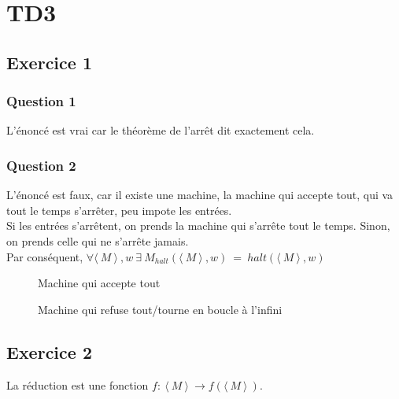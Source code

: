 \section{TD3}

\subsection{Exercice 1}

\subsubsection{Question 1}

L'énoncé est vrai car le théorème de l'arrêt dit exactement cela.

\subsubsection{Question 2}

L'énoncé est faux, car il existe une machine, la machine qui accepte tout, qui va tout le temps s'arrêter, peu impote les entrées.\\
Si les entrées s'arrêtent, on prends la machine qui s'arrête tout le temps. Sinon, on prends celle qui ne s'arrête jamais.\\
Par conséquent, $\forall \langle\ M\ \rangle \!\ ,w~\exists~M_{halt}(\langle\ M\ \rangle \!\ , w)~=~halt(\langle\ M\ \rangle \!\ , w)$

\begin{figure}[ht]
  \centering
  \caption{Machine qui accepte tout}
\end{figure}

\begin{figure}[ht]
  \centering
  \caption{Machine qui refuse tout/tourne en boucle à l'infini}
\end{figure}

\subsection{Exercice 2}

La réduction est une fonction $f:~\langle\ M\ \rangle \!\ \rightarrow f(\langle\ M\ \rangle \!\ )$.

